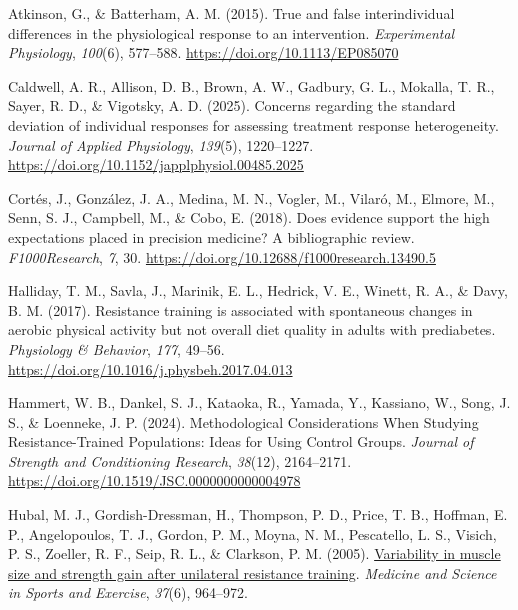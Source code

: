 \documentclass[
]{article}
\newlength{\cslhangindent}
\newenvironment{CSLReferences}[2] %
 {\begin{list}{}{%
  \setlength{\itemindent}{0pt}
  \setlength{\leftmargin}{0pt}
  \setlength{\parsep}{0pt}
  \ifodd #1
   \setlength{\leftmargin}{\cslhangindent}
   \setlength{\itemindent}{-1\cslhangindent}
  \fi
  \setlength{\itemsep}{#2\baselineskip}}}
 {\end{list}}
\begin{document}
\protect{}\label{refs}
\begin{CSLReferences}{1}{0}
Atkinson, G., \& Batterham, A. M. (2015). True and false interindividual
differences in the physiological response to an intervention.
\emph{Experimental Physiology}, \emph{100}(6), 577--588.
\url{https://doi.org/10.1113/EP085070}

Caldwell, A. R., Allison, D. B., Brown, A. W., Gadbury, G. L., Mokalla,
T. R., Sayer, R. D., \& Vigotsky, A. D. (2025). Concerns regarding the
standard deviation of individual responses for assessing treatment
response heterogeneity. \emph{Journal of Applied Physiology},
\emph{139}(5), 1220--1227.
\url{https://doi.org/10.1152/japplphysiol.00485.2025}

Cortés, J., González, J. A., Medina, M. N., Vogler, M., Vilaró, M.,
Elmore, M., Senn, S. J., Campbell, M., \& Cobo, E. (2018). Does evidence
support the high expectations placed in precision medicine? {A}
bibliographic review. \emph{F1000Research}, \emph{7}, 30.
\url{https://doi.org/10.12688/f1000research.13490.5}

Halliday, T. M., Savla, J., Marinik, E. L., Hedrick, V. E., Winett, R.
A., \& Davy, B. M. (2017). Resistance training is associated with
spontaneous changes in aerobic physical activity but not overall diet
quality in adults with prediabetes. \emph{Physiology \& Behavior},
\emph{177}, 49--56. \url{https://doi.org/10.1016/j.physbeh.2017.04.013}

Hammert, W. B., Dankel, S. J., Kataoka, R., Yamada, Y., Kassiano, W.,
Song, J. S., \& Loenneke, J. P. (2024). Methodological {Considerations
When Studying Resistance-Trained Populations}: {Ideas} for {Using
Control Groups}. \emph{Journal of Strength and Conditioning Research},
\emph{38}(12), 2164--2171.
\url{https://doi.org/10.1519/JSC.0000000000004978}

Hubal, M. J., Gordish-Dressman, H., Thompson, P. D., Price, T. B.,
Hoffman, E. P., Angelopoulos, T. J., Gordon, P. M., Moyna, N. M.,
Pescatello, L. S., Visich, P. S., Zoeller, R. F., Seip, R. L., \&
Clarkson, P. M. (2005).
\href{https://www.ncbi.nlm.nih.gov/pubmed/15947721}{Variability in
muscle size and strength gain after unilateral resistance training}.
\emph{Medicine and Science in Sports and Exercise}, \emph{37}(6),
964--972.


\end{CSLReferences}
\end{document}
